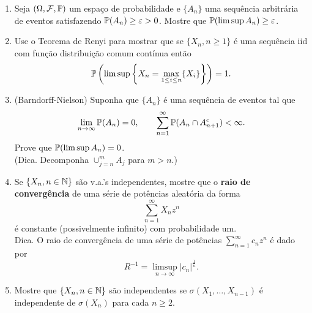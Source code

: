 \begin{enumerate}[leftmargin=*]
\item Seja $(\Omega,\F,\P)$ um espaço de probabilidade e 
$\{A_n\}$ uma sequência arbitrária de eventos satisfazendo 
$\P(A_n)\geq \varepsilon>0$.
Mostre que $\P(\limsup A_n)\geq \varepsilon$.








\item 
Use o Teorema de Renyi para mostrar que se 
$\{X_n, n\geq 1\}$ é uma sequência iid com função distribuição
comum contínua então 
	\[
		\P\left( \limsup \left\{ X_n = \max_{1\leq i\leq n}\{X_i\}\right\} \right)
		=1.
	\]






\item 
(Barndorff-Nielson) Suponha que $\{A_n\}$ é uma sequência
de eventos tal que 
\[
	\lim_{n\to\infty} \P(A_n)=0,
	\qquad
	\sum_{n=1}^{\infty} \P(A_n\cap A_{n+1}^c)<\infty.
\]
Prove que $\P(\limsup A_n)=0$. 
\\
(Dica. Decomponha $\cup_{j=n}^m A_j$ para $m>n$.)














\item 
Se $\{X_n, n\in\N\}$ são v.a.'s independentes, mostre que
o {\bf raio de convergência} de uma série de potências aleatória 
da forma 
	\[
		\sum_{n=1}^{\infty} X_n z^n
	\]
é constante (possivelmente infinito) com probabilidade um.
\\
Dica. O raio de convergência de uma série de potências 
$\sum_{n=1}^{\infty} c_nz^n$ é dado por 
	\[
		R^{-1} = \limsup_{n\to\infty} |c_n|^{\frac{1}{n}}.
	\]





\item 
Mostre que $\{X_n, n\in\N\}$ são independentes se 
$\sigma(X_1,\ldots,X_{n-1})$ 
é independente de $\sigma(X_n)$ para cada $n\geq 2$.










\end{enumerate}
